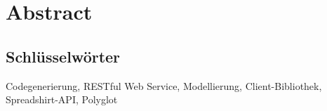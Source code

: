 \chapter*{Abstract}







\section*{Schlüsselwörter}

Codegenerierung, RESTful Web Service, Modellierung, Client-Bibliothek, Spreadshirt-API, Polyglot
\newpage